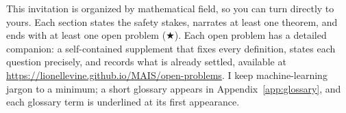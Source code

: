 
This invitation is organized by mathematical field, so you can turn directly to yours. Each section states the safety stakes, narrates at least one theorem, and ends with at least one open problem (\ensuremath{\bigstar}). Each open problem has a detailed companion: a self-contained supplement that fixes every definition, states each question precisely, and records what is already settled, available at \url{https://lionellevine.github.io/MAIS/open-problems}. %
I keep machine-learning jargon to a minimum; a short glossary appears in Appendix~\ref{app:glossary}, and each glossary term is underlined at its first appearance.
